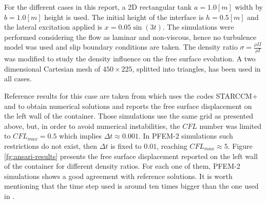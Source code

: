 For the different cases in this report, a 2D rectangular tank $a=1.0[m]$ width by $b=1.0[m]$ height is used. The initial height of the interface is $h=0.5[m]$ and the lateral excitation applied is $x=0.05\sin(3t)$. The simulations were performed considering the
flow as laminar and non-viscous, hence no turbulence model was used and slip boundary conditions are taken. The density ratio $\sigma=\frac{\rho{II}}{\rho{I}}$ was modified to study the density influence on the free surface evolution. A two dimensional Cartesian mesh of $450\times225$, splitted into triangles, has been used in all cases.

Reference results for this case are taken from \cite{Goni13} which uses the codes STARCCM+ and \OF to obtain numerical solutions and reports the free surface displacement on the left wall of the container. Those simulations use the same grid as presented above, but, in order to avoid numerical instabilities, the $CFL$ number was limited to $CFL_{max}=0.5$ which implies $\Delta t \approx 0.001$. In PFEM-2 simulations such restrictions do not exist, then $\Delta t$ is fixed to $0.01$, reaching $CFL_{max}\approx5$.
Figure \ref{fg:ansari-results} presents the free surface displacement reported on the left wall of the container for different density ratios. For each one of them, PFEM-2 simulations shows a good agreement with reference solutions. It is worth mentioning that the time step used is around ten times bigger than the one used in \cite{Goni13}.



